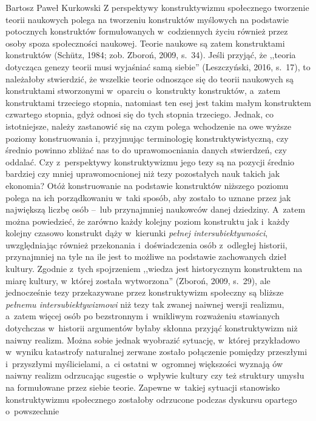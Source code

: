 \begin{artplenv}{Bartosz Paweł Kurkowski}
Z perspektywy konstruktywizmu społecznego tworzenie teorii naukowych polega na tworzeniu konstruktów myślowych na
podstawie potocznych konstruktów formułowanych w~codziennych życiu również przez osoby spoza społeczności naukowej.
Teorie naukowe są zatem konstruktami konstruktów \label{ref:RNDC61JBCWzcS}(Schütz, 1984; zob. Zboroń, 2009, s.~34).
Jeśli przyjąć, że ,,teoria dotycząca genezy teorii musi wyjaśniać samą siebie'' \label{ref:RND32FT5qwMX7}(Leszczyński,
2016, s.~17), to należałoby stwierdzić, że wszelkie teorie odnoszące się do teorii naukowych są konstruktami
stworzonymi w~oparciu o~konstrukty konstruktów, a~zatem konstruktami trzeciego stopnia, natomiast ten esej jest takim
małym konstruktem czwartego stopnia, gdyż odnosi się do tych stopnia trzeciego. Jednak, co istotniejsze, należy
zastanowić się na czym polega wchodzenie na owe wyższe poziomy konstruowania i, przyjmując terminologię
konstruktywistyczną, czy średnio powinno zbliżać nas to do uprawomocniania danych stwierdzeń, czy oddalać.
Czy z~perspektywy konstruktywizmu jego tezy są na pozycji średnio bardziej czy mniej uprawomocnionej niż tezy pozostałych
nauk takich jak ekonomia? Otóż konstruowanie na podstawie konstruktów niższego poziomu polega na ich
porządkowaniu w~taki sposób, aby zostało to uznane przez jak największą liczbę osób --~lub przynajmniej naukowców danej
dziedziny. A~zatem można powiedzieć, że zarówno każdy kolejny poziom konstruktu jak i~każdy kolejny czasowo konstrukt
dąży w~kierunki \textit{pełnej intersubiektywności}, uwzględniając również przekonania i~doświadczenia osób z~odległej
historii, przynajmniej na tyle na ile jest to możliwe na podstawie zachowanych dzieł kultury. Zgodnie z~tych
spojrzeniem ,,wiedza jest historycznym konstruktem na miarę kultury, w~której została wytworzona''
\label{ref:RNDJMAxgf9MvQ}(Zboroń, 2009, s.~29), ale jednocześnie tezy przekazywane przez konstruktywizm społeczny są
bliższe \textit{pełnemu intersubiektywizmowi} niż tezy tak zwanej naiwnej wersji realizmu, a~zatem więcej osób po
bezstronnym i~wnikliwym rozważeniu stawianych dotychczas w~historii argumentów byłaby skłonna przyjąć konstruktywizm
niż naiwny realizm. Można sobie jednak wyobrazić sytuację, w~której przykładowo w~wyniku katastrofy naturalnej zerwane
zostało połączenie pomiędzy przeszłymi i~przyszłymi myślicielami, a~ci ostatni w~ogromnej większości wyznają ów naiwny
realizm odrzucając sugestie o~wpływie kultury czy też struktury umysłu na formułowane przez siebie teorie.
Zapewne w~takiej sytuacji stanowisko konstruktywizmu społecznego zostałoby odrzucone podczas dyskursu opartego o~powszechnie

\end{artplenv}
